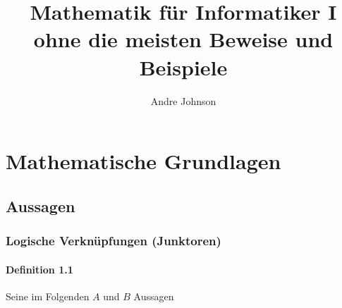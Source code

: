 \documentclass[a5paper, 10pt]{book}
\title{Mathematik für Informatiker I\\ {\large ohne die meisten Beweise und Beispiele}}
\author{Andre Johnson}
\begin{document}
	
	\maketitle
	
	\tableofcontents
	
	\chapter{Mathematische Grundlagen}
		
		\section{Aussagen}
		
			\subsection{Logische Ver\-knüp\-fung\-en (Junktoren)} 
				
				\subsubsection{Definition 1.1}
					Seine im Folgenden $A$ und $B$ Aussagen
					
\end{document}
